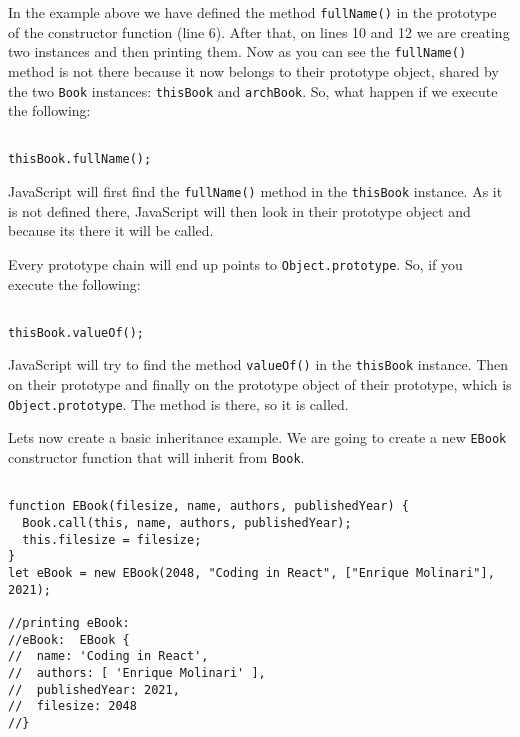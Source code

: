 \documentclass[a4paper, oneside, titlepage, 12pt]{book}
\begin{document}
In the example above we have defined the method \texttt{fullName()} in the prototype of the constructor function (line 6). After that, on lines 10 and 12 we are creating two instances and then printing them. Now as you can see the \texttt{fullName()} method is not there because it now belongs to their prototype object, shared by the two \texttt{Book} instances: \texttt{thisBook} and \texttt{archBook}. So, what happen if we execute the following:

\begin{verbatim}

thisBook.fullName();
\end{verbatim}

JavaScript will first find the \texttt{fullName()} method in the \texttt{thisBook} instance. As it is not defined there, JavaScript will then look in their prototype object and because its there it will be called. 

Every prototype chain will end up points to \texttt{Object.prototype}. So, if you execute the following:

\begin{verbatim}

thisBook.valueOf();
\end{verbatim}

JavaScript will try to find the method \texttt{valueOf()} in the \texttt{thisBook} instance. Then on their prototype and finally on the prototype object of their prototype, which is \texttt{Object.prototype}. The method is there, so it is called.

Lets now create a basic inheritance example. We are going to create a new \texttt{EBook} constructor function that will inherit from \texttt{Book}.

\begin{verbatim}

function EBook(filesize, name, authors, publishedYear) {
  Book.call(this, name, authors, publishedYear);
  this.filesize = filesize;
}
let eBook = new EBook(2048, "Coding in React", ["Enrique Molinari"], 2021);

//printing eBook:
//eBook:  EBook {
//  name: 'Coding in React',
//  authors: [ 'Enrique Molinari' ],
//  publishedYear: 2021,
//  filesize: 2048
//}
\end{verbatim}
\end{document}
